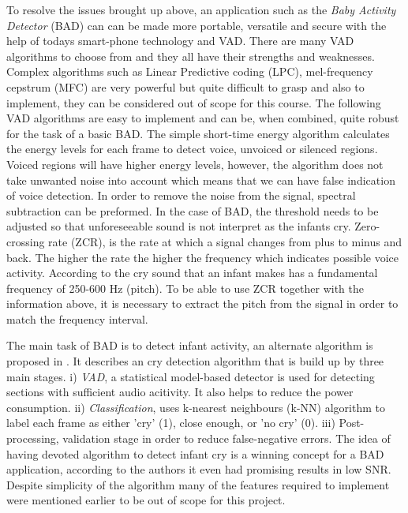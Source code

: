 To resolve the issues brought up above, an application such as the \emph{Baby Activity Detector} (BAD) can can be made more 
portable, versatile and secure with the help of todays smart-phone technology and VAD. There are
many VAD algorithms to choose from and they all have their strengths and weaknesses. Complex 
algorithms such as Linear Predictive coding (LPC), mel-frequency cepstrum (MFC) are very powerful
but quite difficult to grasp and also to implement, they can be considered out of scope for 
this course. The following VAD algorithms are easy to implement and can be, when combined, quite robust 
for the task of a basic BAD. The simple short-time energy algorithm calculates the energy levels 
for each frame to detect voice, unvoiced or silenced regions. Voiced regions will have higher 
energy levels, however, the algorithm does not take unwanted noise into account which means 
that we can have false indication of voice detection. In order to remove the noise from the 
signal, spectral subtraction can be preformed. In the case of BAD, the threshold needs to be 
adjusted so that unforeseeable sound is not interpret as the infants cry. 
Zero-crossing rate (ZCR), is the rate at which a signal changes from plus to minus and back. 
The higher the rate the higher the frequency which indicates possible voice activity. According to \cite{infantDetec} 
the cry sound that an infant makes has a fundamental frequency of 250-600 Hz (pitch). To be able to
use ZCR together with the information above, it is necessary to extract the pitch from the signal
in order to match the frequency interval. 

The main task of BAD is to detect infant activity, an alternate algorithm is proposed in \cite{infantDetec}. 
It describes an cry detection algorithm that is build up by three main stages. i) \emph{VAD}, a 
statistical model-based detector \cite{statis} is used for detecting sections with sufficient audio acitivity. It also helps
to reduce the power consumption. ii) \emph{Classification}, uses k-nearest neighbours (k-NN) algorithm \cite{k-NN} 
to label each frame as either 'cry' (1), close enough, or 'no cry' (0). iii) Post-processing, 
validation stage in order to reduce false-negative errors. The idea of having devoted algorithm to detect
infant cry is a winning concept for a BAD application, according to the authors it even had promising results 
in low SNR. Despite simplicity of the algorithm many of the features required to implement were mentioned
earlier to be out of scope for this project.

